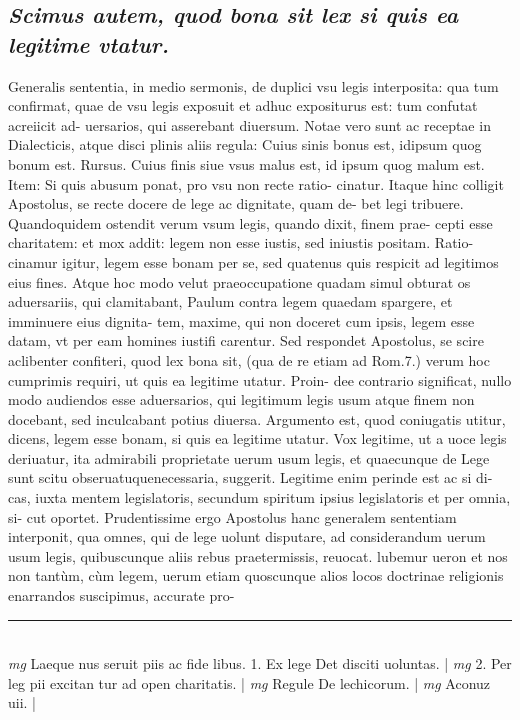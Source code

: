 \documentclass{article}
\begin{document}
\begin{pages}
\subsection*{\textit{Scimus autem, quod bona sit lex si quis ea legitime vtatur. }}\pstart Generalis sententia, in medio sermonis, de duplici vsu legis interposita: qua tum confirmat, quae de vsu legis exposuit et adhuc expositurus est: tum confutat acreiicit ad- uersarios, qui asserebant diuersum. Notae vero sunt ac receptae in Dialecticis, atque  disci plinis aliis regula: Cuius sinis bonus est, idipsum quog bonum est. Rursus. Cuius finis siue vsus malus est, id ipsum quog malum est. Item: Si quis abusum ponat, pro vsu non recte ratio- cinatur. Itaque hinc colligit Apostolus, se recte docere de lege ac dignitate, quam de- bet legi tribuere. Quandoquidem ostendit verum vsum legis, quando dixit, finem prae- cepti esse charitatem: et mox addit: legem non esse iustis, sed iniustis positam. Ratio- cinamur igitur, legem esse bonam per se, sed quatenus quis respicit ad legitimos eius fines. Atque hoc modo velut praeoccupatione quadam simul obturat os aduersariis, qui clamitabant, Paulum contra legem quaedam spargere, et imminuere eius dignita- tem, maxime, qui non doceret cum ipsis, legem esse datam, vt per eam homines iustifi carentur. Sed respondet Apostolus, se scire aclibenter confiteri, quod lex bona sit, (qua de re etiam ad Rom.7.) verum hoc cumprimis requiri, ut quis ea legitime utatur. Proin- dee contrario significat, nullo modo audiendos esse aduersarios, qui legitimum legis usum atque  finem non docebant, sed inculcabant potius diuersa. Argumento est, quod coniugatis utitur, dicens, legem esse bonam, si quis ea legitime utatur. Vox legitime, ut a uoce legis deriuatur, ita admirabili proprietate uerum usum legis, et quaecunque  de Lege sunt scitu obseruatuquenecessaria, suggerit. Legitime enim perinde est ac si di- cas, iuxta mentem legislatoris, secundum spiritum ipsius legislatoris et per omnia, si- cut oportet. Prudentissime ergo Apostolus hanc generalem sententiam interponit, qua omnes, qui de lege uolunt disputare, ad considerandum uerum usum legis, quibuscunque  aliis rebus praetermissis, reuocat. lubemur ueron et nos non tantùm, cùm legem, uerum etiam quoscunque  alios locos doctrinae religionis enarrandos suscipimus, accurate pro-  \pend
\vspace{0.5cm}\noindent
\vspace{0.2cm}\rule{1cm}{0.2pt}\\ 
\hspace{0.2cm}\textit{mg}
\footnotesize Laeque nus seruit piis ac fide libus. 1. Ex lege Det disciti uoluntas. 
\normalsize| 
\hspace{0.2cm}\textit{mg}
\footnotesize 2. Per leg pii excitan tur ad open charitatis. 
\normalsize| 
\hspace{0.2cm}\textit{mg}
\footnotesize Regule De lechicorum. 
\normalsize| 
\hspace{0.2cm}\textit{mg}
\footnotesize Aconuz uii. 
\normalsize| 

\end{pages}
\end{document}
